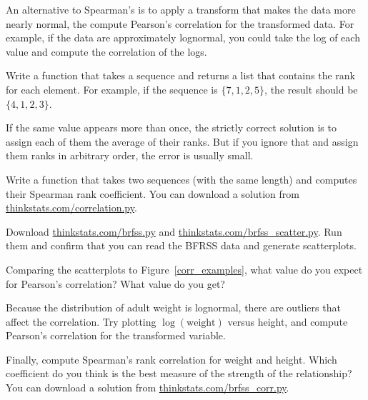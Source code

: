 \documentclass[12pt]{book}
\begin{document}
An alternative to Spearman's is to apply a transform that makes the
data more nearly normal, the compute Pearson's correlation for the
transformed data.  For example, if the data are approximately
lognormal, you could take the log of each value and compute the
correlation of the logs.


\begin{exercise}
Write a function that takes a sequence and returns a list that
contains the rank for each element.  For example, if the sequence is
$\{ 7, 1, 2, 5 \}$, the result should be $\{ 4, 1, 2, 3 \}$.

If the same value appears more than once, the strictly correct
solution is to assign each of them the average of their ranks.  But if
you ignore that and assign them ranks in arbitrary order, the error is
usually small.

Write a function that takes two sequences (with the same length) and
computes their Spearman rank coefficient.  You can download a solution
from \url{thinkstats.com/correlation.py}.



\end{exercise}


\begin{exercise}
Download \url{thinkstats.com/brfss.py} and
\url{thinkstats.com/brfss_scatter.py}.  Run them and confirm that you
can read the BFRSS data and generate scatterplots.



Comparing the scatterplots to Figure~\ref{corr_examples}, what value
do you expect for Pearson's correlation?  What value do you get?


Because the distribution of adult weight is lognormal, there are
outliers that affect the correlation.  Try plotting
$\log(\mathrm{weight})$ versus height, and compute Pearson's
correlation for the transformed variable.

Finally, compute Spearman's rank correlation for weight and height.
Which coefficient do you think is the best measure of the strength of
the relationship?  You can download a solution from
\url{thinkstats.com/brfss_corr.py}.


\end{exercise}
\end{document}
